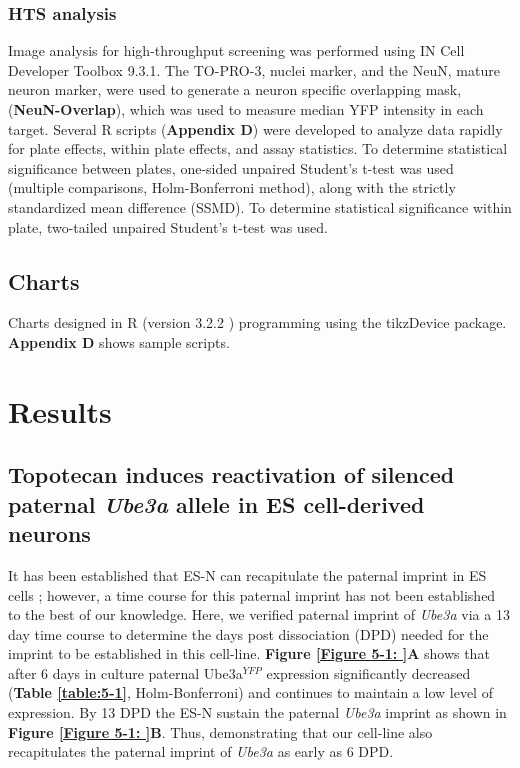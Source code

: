 \subsubsection*{HTS analysis}

Image analysis for high-throughput screening was performed using IN Cell Developer Toolbox 9.3.1. The TO-PRO-3, nuclei marker, and the NeuN, mature neuron marker, were used to generate a neuron specific overlapping mask, (\textbf{NeuN-Overlap}), which was used to measure median YFP intensity in each target. Several R scripts (\textbf{Appendix D}) were developed to analyze data rapidly for plate effects, within plate effects, and assay statistics. To determine statistical significance between plates, one-sided unpaired Student's t-test was used (multiple comparisons, Holm-Bonferroni method), along with the strictly standardized mean difference (SSMD). To determine statistical significance within plate, two-tailed unpaired Student's t-test was used.

\subsection{Charts}

Charts designed in R (version 3.2.2 \cite{Rcite2016}) programming using the tikzDevice package. \textbf{Appendix D} shows sample scripts.

\section{Results}

\subsection{Topotecan induces reactivation of silenced paternal \textit{Ube3a} allele in ES cell-derived neurons}

It has been established that ES-N can recapitulate the paternal imprint in ES cells \cite{Kohama2012,Meng2012}; however, a time course for this paternal imprint has not been established to the best of our knowledge. Here, we verified paternal imprint of \textit{Ube3a} via a 13 day time course to determine the days post dissociation (DPD) needed for the imprint to be established in this cell-line. \textbf{Figure \ref{Figure 5-1: }A} shows that after 6 days in culture paternal Ube3a$^{YFP}$ expression significantly decreased (\textbf{Table \ref{table:5-1}}, Holm-Bonferroni) and continues to maintain a low level of expression. By 13 DPD the ES-N sustain the paternal \textit{Ube3a} imprint as shown in \textbf{Figure \ref{Figure 5-1: }B}. Thus, demonstrating that our cell-line also recapitulates the paternal imprint of \textit{Ube3a} as early as 6 DPD.

